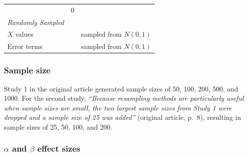 \documentclass[10,a4paperpaper,]{article}
\begin{document}
\begin{longtable}[]{@{}lll@{}}
\begin{minipage}[t]{0.05\columnwidth}
\end{minipage} & \begin{minipage}[t]{0.37\columnwidth}\raggedright\strut
0\strut
\end{minipage}\tabularnewline
\begin{minipage}[t]{0.18\columnwidth}\raggedright\strut
\emph{Randomly Sampled}\strut
\end{minipage} & \begin{minipage}[t]{0.05\columnwidth}\raggedright\strut
\strut
\end{minipage} & \begin{minipage}[t]{0.37\columnwidth}\raggedright\strut
\strut
\end{minipage}\tabularnewline
\begin{minipage}[t]{0.18\columnwidth}\raggedright\strut
\(X\) values\strut
\end{minipage} & \begin{minipage}[t]{0.05\columnwidth}\raggedright\strut
\strut
\end{minipage} & \begin{minipage}[t]{0.37\columnwidth}\raggedright\strut
sampled from \(N(0,1)\)\strut
\end{minipage}\tabularnewline
\begin{minipage}[t]{0.18\columnwidth}\raggedright\strut
Error terms\strut
\end{minipage} & \begin{minipage}[t]{0.05\columnwidth}\raggedright\strut
\strut
\end{minipage} & \begin{minipage}[t]{0.37\columnwidth}\raggedright\strut
sampled from \(N(0,1)\)\strut
\end{minipage}\tabularnewline
\bottomrule
\end{longtable}

\subsubsection{Sample size}

Study 1 in the original article generated sample sizes of 50, 100, 200,
500, and 1000. For the second study, \emph{``Because resampling methods
are particularly useful when sample sizes are small, the two largest
sample sizes from Study 1 were dropped and a sample size of 25 was
added''} (original article, p.~8), resulting in sample sizes of 25, 50,
100, and 200.

\subsubsection{$\alpha$ and $\beta$ effect sizes}
\end{document}

